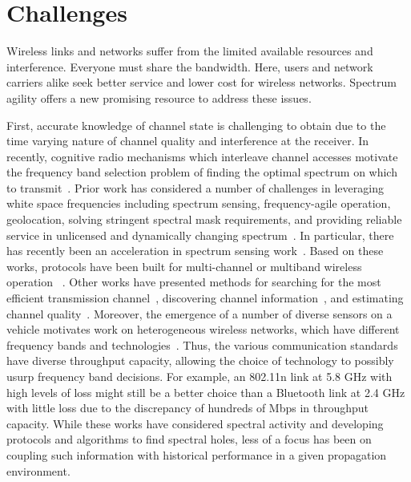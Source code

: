 \section{Challenges}

Wireless links and networks suffer from the limited available resources and interference. 
Everyone must share the bandwidth. Here, users and network carriers alike seek better 
service and lower cost for wireless networks. Spectrum agility offers a new promising 
resource to address these issues. 


First, accurate knowledge of channel state is challenging to obtain due to the time varying 
nature of channel quality and interference at the receiver. In recently, cognitive radio 
mechanisms which interleave channel accesses motivate the frequency band selection problem 
of finding the optimal spectrum on which to transmit~\cite{ghasemi2008spectrum}. Prior work 
has considered a number of challenges in leveraging white space frequencies including spectrum 
sensing, frequency-agile operation, geolocation, solving stringent spectral mask requirements, 
and providing reliable service in unlicensed and dynamically changing spectrum~\cite{shellhammer2009technical}. 
In particular, there has recently been an acceleration in spectrum sensing work~\cite{rayanchu2011fluid, kim1996pulse,cabric2004implementation}. 
Based on these works, protocols have been built for multi-channel or multiband wireless operation
~\cite{MOAR,raychaudhuri2003spectrum,sabharwal2007opportunistic}. Other works have presented 
methods for searching for the most efficient transmission channel~\cite{mo2005comparison}, 
discovering channel information~\cite{rayanchu2011fluid, sabharwal2007opportunistic}, and 
estimating channel quality~\cite{MOAR}. Moreover, the emergence of a number of diverse sensors 
on a vehicle motivates work on heterogeneous wireless networks, which have different frequency 
bands and technologies~\cite{hossain2010vehicular}. Thus, the various communication standards 
have diverse throughput capacity, allowing the choice of technology to possibly usurp frequency 
band decisions. For example, an 802.11n link at 5.8 GHz with high levels of loss might still be 
a better choice than a Bluetooth link at 2.4 GHz with little loss due to the discrepancy of 
hundreds of Mbps in throughput capacity. While these works have considered spectral activity and 
developing protocols and algorithms to find spectral holes, less of a focus has been on coupling 
such information with historical performance in a given propagation environment.

